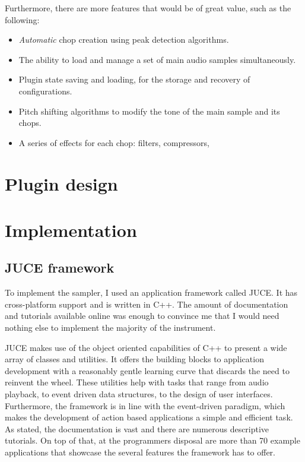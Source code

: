 \documentclass[12pt, a4paper, hidelinks]{article}
\begin{document}
	Furthermore, there are more features that would be of great value, such as the following:
	\begin{itemize}
		\item \textit{Automatic} chop creation using peak detection algorithms.
		\item The ability to load and manage a set of main audio samples simultaneously.
		\item Plugin state saving and loading, for the storage and recovery of configurations.
		\item Pitch shifting algorithms to modify the tone of the main sample and its chops.
		\item A series of effects for each chop: filters, compressors, 
	\end{itemize}

	
	\newpage	
	\section{Plugin design}
	
	
	\newpage
	\section{Implementation}
	\subsection{JUCE framework}
	To implement the sampler, I used an application framework called JUCE\cite{juceweb}. It has cross-platform support and is written in C++. The amount of documentation and tutorials available online was enough to convince me that I would need nothing else to implement the majority of the instrument.
	
	JUCE makes use of the object oriented capabilities of C++ to present a wide array of classes and utilities. It offers the building blocks to application development with a reasonably gentle learning curve that discards the need to reinvent the wheel. These utilities help with tasks that range from audio playback, to event driven data structures, to the design of user interfaces. Furthermore, the framework is in line with the event-driven paradigm, which makes the development of action based applications a simple and efficient task. As stated, the documentation is vast and there are numerous descriptive tutorials. On top of that, at the programmers disposal are more than 70 example applications that showcase the several features the framework has to offer. 
	
\end{document}
